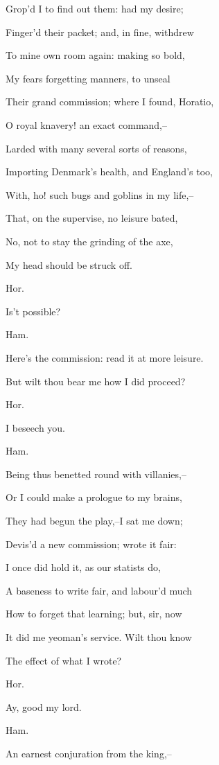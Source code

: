 \documentclass[12pt]{book}
\begin{document}
Grop'd I to find out them: had my desire;

Finger'd their packet; and, in fine, withdrew

To mine own room again: making so bold,

My fears forgetting manners, to unseal

Their grand commission; where I found, Horatio,

O royal knavery! an exact command,--

Larded with many several sorts of reasons,

Importing Denmark's health, and England's too,

With, ho! such bugs and goblins in my life,--

That, on the supervise, no leisure bated,

No, not to stay the grinding of the axe,

My head should be struck off.



Hor.

Is't possible?



Ham.

Here's the commission: read it at more leisure.

But wilt thou bear me how I did proceed?



Hor.

I beseech you.



Ham.

Being thus benetted round with villanies,--

Or I could make a prologue to my brains,

They had begun the play,--I sat me down;

Devis'd a new commission; wrote it fair:

I once did hold it, as our statists do,

A baseness to write fair, and labour'd much

How to forget that learning; but, sir, now

It did me yeoman's service. Wilt thou know

The effect of what I wrote?



Hor.

Ay, good my lord.



Ham.

An earnest conjuration from the king,--
\end{document}

